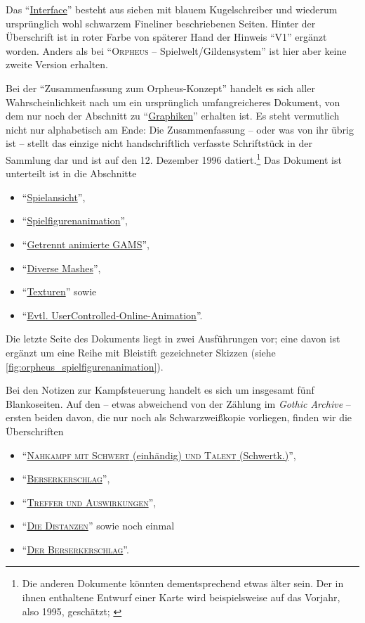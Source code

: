 \documentclass[a5paper,pagesize,numbers=noenddot]{scrbook}
\begin{document}
Das \enquote{\uline{Interface}} besteht aus sieben mit blauem Kugelschreiber und wiederum ursprünglich wohl schwarzem Fineliner beschriebenen Seiten.
Hinter der Überschrift ist in roter Farbe von späterer Hand der Hinweis \enquote{V1} ergänzt worden.
Anders als bei \enquote{\textsc{Orpheus} -- Spielwelt/Gildensystem} ist hier aber keine zweite Version erhalten.

Bei der \enquote{Zusammenfassung zum Orpheus-Konzept} handelt es sich aller Wahrscheinlichkeit nach um ein ursprünglich umfangreicheres Dokument, von dem nur noch der Abschnitt zu \enquote{\uline{Graphiken}} erhalten ist.\autocite[Vgl.][]{archive_orpheus_2024}
Es steht vermutlich nicht nur alphabetisch am Ende:
Die Zusammenfassung -- oder was von ihr übrig ist -- stellt das einzige nicht handschriftlich verfasste Schriftstück in der Sammlung dar und ist auf den 12. Dezember 1996 datiert.\footnote{Die anderen Dokumente könnten dementsprechend etwas älter sein.
Der in ihnen enthaltene Entwurf einer Karte wird beispielsweise auf das Vorjahr, also 1995, geschätzt; \autocite[vgl.][]{flosha_evolution_2024}}
Das Dokument ist unterteilt ist in die Abschnitte

\begin{itemize}
   \item \enquote{\uline{Spielansicht}},
   \item \enquote{\uline{Spielfigurenanimation}},
   \item \enquote{\uline{Getrennt animierte GAMS}},
   \item \enquote{\uline{Diverse Mashes}},
   \item \enquote{\uline{Texturen}} sowie
   \item \enquote{\uline{Evtl. User\-Controlled-Online-Animation}}.
\end{itemize}

\noindent Die letzte Seite des Dokuments liegt in zwei Ausführungen vor; eine davon ist ergänzt um eine Reihe mit Bleistift gezeichneter Skizzen (siehe \autoref{fig:orpheus_spielfigurenanimation}).

Bei den Notizen zur Kampfsteuerung handelt es sich um insgesamt fünf Blankoseiten.
Auf den -- etwas abweichend von der Zählung im \textit{Gothic Archive} -- ersten beiden davon, die nur noch als Schwarzweißkopie vorliegen, finden wir die Überschriften

\begin{itemize}
   \item \enquote{\uline{\textsc{Nahkampf mit Schwert} (einhändig) \textsc{und Talent} (Schwertk.)}},
   \item \enquote{\uline{\textsc{Berserkerschlag}}},
   \item \enquote{\uline{\textsc{Treffer und Auswirkungen}}},
   \item \enquote{\uline{\textsc{Die Distanzen}}} sowie noch einmal
   \item \enquote{\uline{\textsc{Der Berserkerschlag}}}.
\end{itemize}
\end{document}
